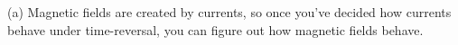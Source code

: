 (a) Magnetic fields are created by currents, so once you've
decided how currents behave under time-reversal, you can
figure out how magnetic fields behave.
